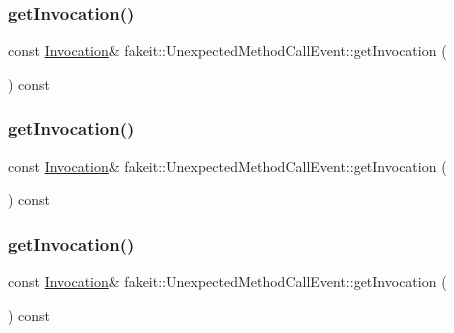 \subsubsection{\texorpdfstring{getInvocation()}{getInvocation()}\hspace{0.1cm}{\footnotesize\ttfamily [6/9]}}
{\footnotesize\ttfamily const \mbox{\hyperlink{structfakeit_1_1Invocation}{Invocation}}\& fakeit\+::\+Unexpected\+Method\+Call\+Event\+::get\+Invocation (\begin{DoxyParamCaption}{ }\end{DoxyParamCaption}) const\hspace{0.3cm}{\ttfamily [inline]}}

\mbox{\label{structfakeit_1_1UnexpectedMethodCallEvent_a80a3e753a6163cecbb4d6f1b75a03f9f}} 
\subsubsection{\texorpdfstring{getInvocation()}{getInvocation()}\hspace{0.1cm}{\footnotesize\ttfamily [7/9]}}
{\footnotesize\ttfamily const \mbox{\hyperlink{structfakeit_1_1Invocation}{Invocation}}\& fakeit\+::\+Unexpected\+Method\+Call\+Event\+::get\+Invocation (\begin{DoxyParamCaption}{ }\end{DoxyParamCaption}) const\hspace{0.3cm}{\ttfamily [inline]}}

\mbox{\label{structfakeit_1_1UnexpectedMethodCallEvent_a80a3e753a6163cecbb4d6f1b75a03f9f}} 
\subsubsection{\texorpdfstring{getInvocation()}{getInvocation()}\hspace{0.1cm}{\footnotesize\ttfamily [8/9]}}
{\footnotesize\ttfamily const \mbox{\hyperlink{structfakeit_1_1Invocation}{Invocation}}\& fakeit\+::\+Unexpected\+Method\+Call\+Event\+::get\+Invocation (\begin{DoxyParamCaption}{ }\end{DoxyParamCaption}) const\hspace{0.3cm}{\ttfamily [inline]}}

